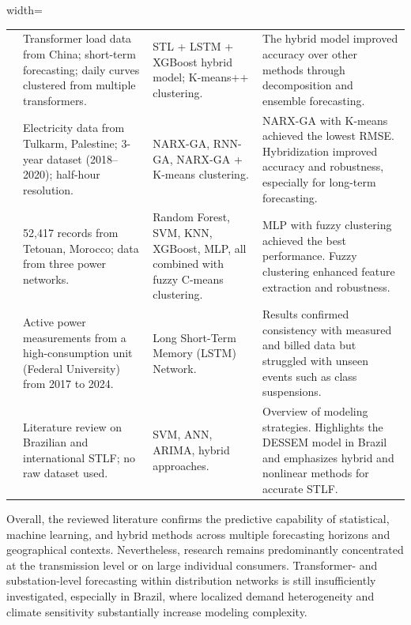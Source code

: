 \begin{table}[p]
{\begin{adjustbox}{width=\textheight}
\begin{tabular}{p{3cm} p{5cm} p{4.5cm} p{6cm}}
\cite{Zhang2023} &
Transformer load data from China; short-term forecasting; daily curves clustered from multiple transformers. &
STL + LSTM + XGBoost hybrid model; K-means++ clustering. &
The hybrid model improved accuracy over other methods through decomposition and ensemble forecasting. \\

\cite{Hussein2024} &
Electricity data from Tulkarm, Palestine; 3-year dataset (2018--2020); half-hour resolution. &
NARX-GA, RNN-GA, NARX-GA + K-means clustering. &
NARX-GA with K-means achieved the lowest RMSE. Hybridization improved accuracy and robustness, especially for long-term forecasting. \\

\cite{Alsalem2025} &
52,417 records from Tetouan, Morocco; data from three power networks. &
Random Forest, SVM, KNN, XGBoost, MLP, all combined with fuzzy C-means clustering. &
MLP with fuzzy clustering achieved the best performance. Fuzzy clustering enhanced feature extraction and robustness. \\

\cite{DosSantos2024} &
Active power measurements from a high-consumption unit (Federal University) from 2017 to 2024. &
Long Short-Term Memory (LSTM) Network. &
Results confirmed consistency with measured and billed data but struggled with unseen events such as class suspensions. \\

\cite{Aquila2023} &
Literature review on Brazilian and international STLF; no raw dataset used. &
SVM, ANN, ARIMA, hybrid approaches. &
Overview of modeling strategies. Highlights the DESSEM model in Brazil and emphasizes hybrid and nonlinear methods for accurate STLF. \\

\bottomrule
\end{tabular}
\end{adjustbox}
}

\end{table}

Overall, the reviewed literature confirms the predictive capability of statistical, machine learning, and hybrid methods across multiple forecasting horizons and geographical contexts. Nevertheless, research remains predominantly concentrated at the transmission level or on large individual consumers. Transformer- and substation-level forecasting within distribution networks is still insufficiently investigated, especially in Brazil, where localized demand heterogeneity and climate sensitivity substantially increase modeling complexity.


